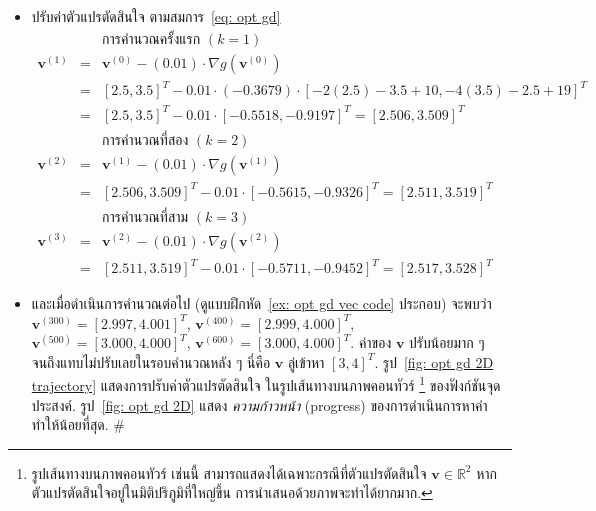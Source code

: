 \begin{itemize}
\item ปรับค่าตัวแปรตัดสินใจ ตามสมการ~\ref{eq: opt gd}
	\\ 
	\begin{eqnarray}
	&\;& \mbox{การคำนวณครั้งแรก } (k=1)
	\nonumber \\
	\bm{v}^{(1)} &=& \bm{v}^{(0)} - (0.01) \cdot \nabla g (\bm{v}^{(0)})
	\nonumber \\
	&=& [2.5, 3.5]^T - 0.01 \cdot (-0.3679) \cdot [-2(2.5)-3.5+10, -4(3.5)-2.5+19]^T
	\nonumber \\
	&=& [2.5, 3.5]^T - 0.01 \cdot [-0.5518,
	-0.9197]^T = [2.506, 3.509]^T
\nonumber \\	
	&\;& \mbox{การคำนวณที่สอง } (k=2)
\nonumber \\		
	\bm{v}^{(2)} &=& \bm{v}^{(1)} - (0.01) \cdot \nabla g (\bm{v}^{(1)})
\nonumber \\	
&=& [2.506, 3.509]^T - 0.01 \cdot [-0.5615, -0.9326]^T = [2.511, 3.519]^T
\nonumber \\
	&\;& \mbox{การคำนวณที่สาม } (k=3)
	\nonumber \\
	\bm{v}^{(3)} &=& \bm{v}^{(2)} - (0.01) \cdot \nabla g (\bm{v}^{(2)})
\nonumber \\	
&=& [2.511, 3.519]^T - 0.01 \cdot [-0.5711, -0.9452]^T = [2.517, 3.528]^T
\nonumber 
	\nonumber
	\end{eqnarray}
	
	\item และเมื่อดำเนินการคำนวณต่อไป
	(ดูแบบฝึกหัด~\ref{ex: opt gd vec code} ประกอบ)
	จะพบว่า 
	$\bm{v}^{(300)} = [2.997, 4.001]^T$,
	$\bm{v}^{(400)} = [2.999, 4.000]^T$,
	$\bm{v}^{(500)} = [3.000, 4.000]^T$,
	$\bm{v}^{(600)} = [3.000, 4.000]^T$.
	ค่าของ $\bm{v}$ ปรับน้อยมาก ๆ จนถึงแทบไม่ปรับเลยในรอบคำนวณหลัง ๆ นี่คือ $\bm{v}$ ลู่เข้าหา $[3, 4]^T$.
	รูป~\ref{fig: opt gd 2D trajectory} แสดงการปรับค่าตัวแปรตัดสินใจ ในรูปเส้นทางบนภาพคอนทัวร์%
	\footnote{รูปเส้นทางบนภาพคอนทัวร์ เช่นนี้ สามารถแสดงได้เฉพาะกรณีที่ตัวแปรตัดสินใจ $\bm{v} \in \mathbb{R}^2$ หากตัวแปรตัดสินใจอยู่ในมิติปริภูมิที่ใหญ่ขึ้น การนำเสนอด้วยภาพจะทำได้ยากมาก.}
	ของฟังก์ชันจุดประสงค์.
	รูป~\ref{fig: opt gd 2D} แสดง \textit{ความก้าวหน้า} (progress) ของการดำเนินการหาค่าทำให้น้อยที่สุด.
	\hfill $\#$%
\end{itemize}

